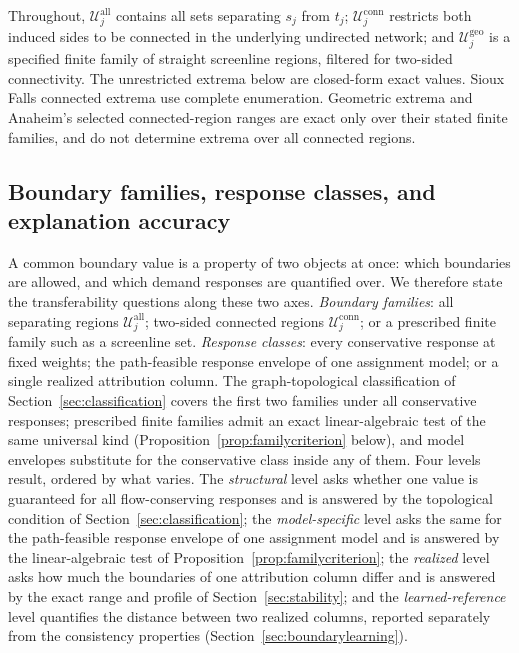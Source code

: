 \documentclass[a4paper,fleqn]{cas-sc}
\begin{document}
Throughout, $\mathcal U_j^{\mathrm{all}}$ contains all sets separating
$s_j$ from $t_j$; $\mathcal U_j^{\mathrm{conn}}$ restricts both induced sides
to be connected in the underlying undirected network; and
$\mathcal U_j^{\mathrm{geo}}$ is a specified finite family of straight
screenline regions, filtered for two-sided connectivity.
The unrestricted extrema below are closed-form exact values. Sioux Falls
connected extrema use complete enumeration. Geometric extrema and Anaheim's
selected connected-region ranges are exact only over their stated finite
families, and do not determine extrema over all connected regions.

\subsection{Boundary families, response classes, and explanation accuracy}\label{sec:levels}\label{sec:hierarchy}
A common boundary value is a property of two objects at once: which
boundaries are allowed, and which demand responses are quantified over.
We therefore state the transferability questions along these two axes.
\emph{Boundary families}: all separating regions
$\mathcal U_j^{\mathrm{all}}$; two-sided connected regions
$\mathcal U_j^{\mathrm{conn}}$; or a prescribed finite family such as a
screenline set. \emph{Response classes}: every conservative response at
fixed weights; the path-feasible response envelope of one assignment model;
or a single realized attribution column. The graph-topological
classification of Section~\ref{sec:classification} covers the first two
families under all conservative responses; prescribed finite families
admit an exact linear-algebraic test of the same universal kind
(Proposition~\ref{prop:familycriterion} below), and model envelopes
substitute for the conservative class inside any of them.
Four levels result, ordered by what varies. The \emph{structural}
level asks whether one value is guaranteed for all flow-conserving
responses and is answered by the topological condition of
Section~\ref{sec:classification}; the \emph{model-specific} level asks
the same for the path-feasible response envelope of one assignment
model and is answered by the linear-algebraic test of
Proposition~\ref{prop:familycriterion}; the \emph{realized} level asks
how much the boundaries of one attribution column differ and is
answered by the exact range and profile of
Section~\ref{sec:stability}; and the \emph{learned-reference} level
quantifies the distance between two realized columns, reported
separately from the consistency properties
(Section~\ref{sec:boundarylearning}).
\end{document}
